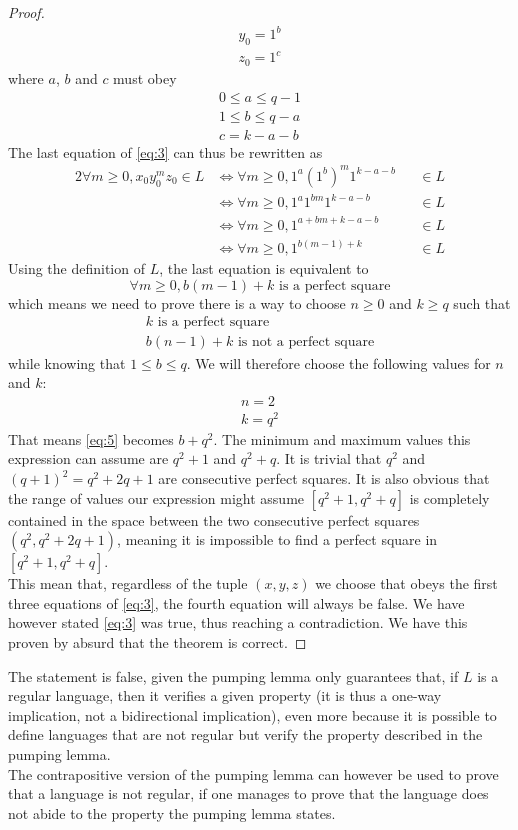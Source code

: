 \documentclass[docid=PA06]{tcom_PA}
\begin{document}
{\begin{proof}
\begin{gather*}
	y_0=1^b\\
	z_0=1^c
\end{gather*}
where $a$, $b$ and $c$ must obey
\begin{gather*}
	0 \leq a \leq q-1\\
	1 \leq b \leq q-a\\
	c = k-a-b
\end{gather*}
The last equation of \eqref{eq:3} can thus be rewritten as
\begin{alignat*}{2}
	\forall m \geq 0, x_0 y_0^m z_0 \in L
	&\iff \forall m \geq 0, 1^a {(1^b)}^m 1^{k-a-b} &&\in L\\
	&\iff \forall m \geq 0, 1^a 1^{bm} 1^{k-a-b}    &&\in L\\
	&\iff \forall m \geq 0, 1^{a+bm+k-a-b}          &&\in L\\
	&\iff \forall m \geq 0, 1^{b(m-1)+k}            &&\in L
\end{alignat*}
Using the definition of $L$, the last equation is equivalent to
\begin{equation*}
	\forall m \geq 0, b(m-1)+k \text{ is a perfect square}\end{equation*}
which means we need to prove there is a way to choose $n \geq 0$ and $k \geq q$ such that
\begin{gather}
	\label{eq:4} k \text{ is a perfect square}\\
	\label{eq:5} b(n-1)+k \text{ is not a perfect square}
\end{gather}
while knowing that $1 \leq b \leq q$.
We will therefore choose the following values for $n$ and $k$:
\begin{gather*}
	n = 2\\
	k = q^2
\end{gather*}
That means \eqref{eq:5} becomes $b+q^2$. The minimum and maximum values this expression can assume are $q^2+1$ and $q^2+q$. It is trivial that $q^2$ and $(q+1)^2=q^2+2q+1$ are consecutive perfect squares. It is also obvious that the range of values our expression might assume $[q^2+1,q^2+q]$ is completely contained in the space between the two consecutive perfect squares $(q^2, q^2+2q+1)$, meaning it is impossible to find a perfect square in $[q^2+1,q^2+q]$.\\
This mean that, regardless of the tuple $(x,y,z)$ we choose that obeys the first three equations of \eqref{eq:3}, the fourth equation will always be false. We have however stated \eqref{eq:3} was true, thus reaching a contradiction. We have this proven by absurd that the theorem is correct.
\end{proof}
The statement is false, given the pumping lemma only guarantees that, if $L$ is a regular language, then it verifies a given property (it is thus a one-way implication, not a bidirectional implication), even more because it is possible to define languages that are not regular but verify the property described in the pumping lemma.\\
The contrapositive version of the pumping lemma can however be used to prove that a language is not regular, if one manages to prove that the language does not abide to the property the pumping lemma states.
}
\end{document}
